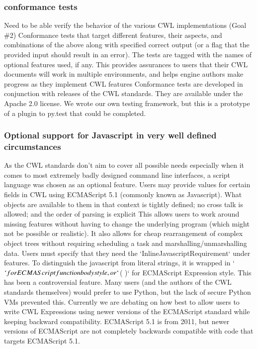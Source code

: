 \subsubsection{conformance tests}
Need to be able verify the behavior of the various CWL implementations (Goal \#2)
Conformance tests that target different features, their aspects, and combinations of the above along with specified correct output (or a flag that the provided input should result in an error). The tests are tagged with the names of optional features used, if any.
This provides assurances to users that their CWL documents will work in multiple environments, and helps engine authors make progress as they implement CWL features
Conformance tests are developed in conjunction with releases of the CWL standards. They are available under the Apache 2.0 license.
We wrote our own testing framework, but this is a prototype of a plugin to py.test that could be completed.
\subsubsection{Optional support for Javascript in very well defined circumstances}
As the CWL standards don’t aim to cover all possible needs especially when it comes to most extremely badly designed command line interfaces, a script language was chosen as an optional feature.
Users may provide values for certain fields in CWL using ECMAScript 5.1 (commonly known as Javascript). What objects are available to them in that context is tightly defined; no cross talk is allowed; and the order of parsing is explicit
This allows users to work around missing features without having to change the underlying program (which might not be possible or realistic). It also allows for cheap rearrangement of complex object trees without requiring scheduling a task and marshalling/unmarshalling data.
Users must specify that they need the `InlineJavascriptRequirement` under features. To distinguish the javascript from literal strings, it is wrapped in `${ }` for  ECMAScript function body style, or `$( )` for ECMAScript Expression style.
This has been a controversial feature. Many users (and the authors of the CWL standards themselves) would prefer to use Python, but the lack of secure Python VMs prevented this. Currently we are debating on how best to allow users to write CWL Expressions using newer versions of the ECMAScript standard while keeping backward compatibility. ECMAScript 5.1 is from 2011, but newer versions of ECMAScript are not completely backwards compatible with code that targets ECMAScript 5.1.

